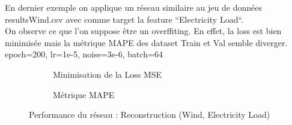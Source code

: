 \documentclass{article}
\begin{document}
    En dernier exemple on applique un réseau similaire au jeu de données resultsWind.csv avec comme target la feature ``Electricity Load``.\\On observe ce que l'on suppose être un overffiting. En effet, la loss est bien minimisée mais la métrique MAPE des dataset Train et Val semble diverger.
    epoch=200, lr=1e-5, noise=3e-6, batch=64
    \begin{figure}[H]
        \centering
        \begin{subfigure}[t]{0.49\textwidth}
            \caption{Minimisation de la Loss MSE}
        \end{subfigure}
        \hfill
        \begin{subfigure}[t]{0.49\textwidth}
        \caption{Métrique MAPE}
    \end{subfigure}
        \caption{Performance du réseau : Reconstruction (Wind, Electricity Load)}
        \label{fig:test}
    \end{figure}
\end{document}
